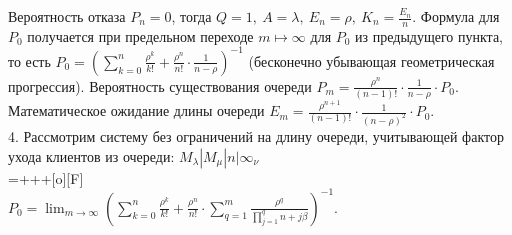 \documentclass{article}
\begin{document}
Вероятность отказа \begin{math}P_n = 0\end{math}, тогда \begin{math}Q = 1, \ A = \lambda, \ E_n = \rho, \ K_n = \displaystyle\frac{E_n}{n}\end{math}. Формула для \begin{math}P_0\end{math} получается при предельном переходе \begin{math}m \mapsto \infty\end{math} для \begin{math}P_0\end{math} из предыдущего пункта, то есть \begin{math} P_0 = \left(\displaystyle\sum^n_{k=0} \displaystyle\frac{\rho^k}{ k!} + \displaystyle\frac{\rho^{n}}{ n!} \cdot\displaystyle\frac{1 }{n  - \rho} \right)^{-1}\end{math} (бесконечно убывающая геометрическая прогрессия). Вероятность существования очереди \begin{math}P_m = \displaystyle\frac{\rho^n}{(n-1)!} \cdot \displaystyle\frac{1}{n - \rho} \cdot P_0\end{math}. Математическое ожидание длины очереди \begin{math}E_m = \displaystyle\frac{\rho^{n+1}}{(n-1)!} \cdot \displaystyle\frac{1}{(n - \rho)^2} \cdot P_0\end{math}.
\vspace{\baselineskip}
\\
4. Рассмотрим систему без ограничений на длину очереди, учитывающей
фактор ухода клиентов из очереди: \begin{math}M_{\lambda}|M_{\mu}|n|\infty_\nu\end{math}
\vspace{\baselineskip}
\\
\entrymodifiers={+++[o][F]}
\vspace{\baselineskip}
\\
\begin{math} P_0 = \displaystyle\lim_{m \to \infty} \left(\sum^n_{k=0} \displaystyle\frac{\rho^k}{ k!} + \displaystyle\frac{\rho^{n}}{n!} \cdot\sum^m_{q=1}\displaystyle\frac{\rho^q}{\displaystyle\prod\limits_{j = 1}^qn + j\beta} \right)^{-1}\end{math}. 
\end{document}
